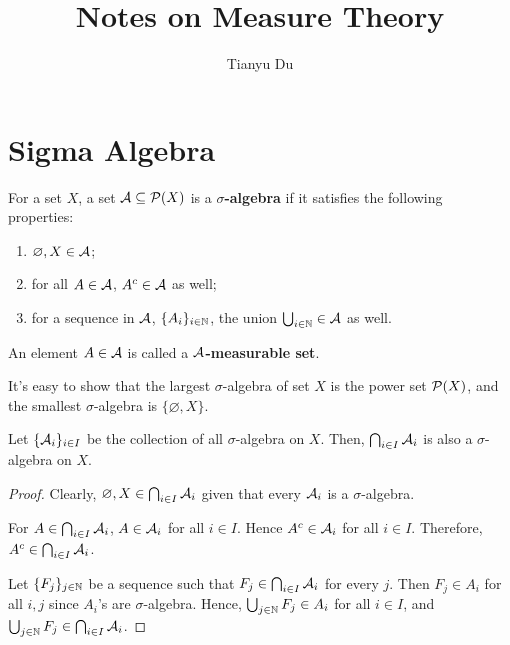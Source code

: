 \documentclass[11pt]{article}
\title{Notes on Measure Theory}
\author{Tianyu Du}
\newcommand{\s}[0]{$\sigma$}
\begin{document}
	
	\maketitle
	\tableofcontents
	\section{Sigma Algebra}
	\begin{definition}
		For a set $X$, a set $\mathcal{{A}} \subseteq \mathcal{{P}}(X)$ is a \textbf{\s-algebra} if it satisfies the following properties:
		\begin{enumerate}
			\item $\varnothing, X \in \mathcal{{A}}$;
			\item for all $A \in \mathcal{{A}}$, $A^c \in \mathcal{{A}}$ as well;
			\item for a sequence in $\mathcal{{A}}$, $\{A_i\}_{i\in\mathbb{N}}$, the union $\bigcup_{i\in\mathbb{N}} \in \mathcal{{A}}$ as well.
		\end{enumerate}
		An element $A \in \mathcal{{A}}$ is called a \textbf{$\mathcal{{A}}$-measurable set}.
	\end{definition}
	
	\begin{remark}
		It's easy to show that the largest \s-algebra of set $X$ is the power set $\mathcal{{P}}(X)$, and the smallest \s-algebra is $\{\varnothing, X\}$.
	\end{remark}
	
	\begin{theorem}
		Let $\{\mathcal{{A}}_i\}_{i \in I}$ be the collection of all $\sigma$-algebra on $X$. Then, $\bigcap_{i \in I} \mathcal{{A}}_i$ is also a $\sigma$-algebra on $X$.
	\end{theorem}
	
	\begin{proof}
		Clearly, $\varnothing, X \in \bigcap_{i \in I} \mathcal{{A}}_i$ given that every $\mathcal{{A}}_i$ is a \s-algebra.
		
		For $A \in \bigcap_{i \in I} \mathcal{{A}}_i$, $A \in \mathcal{{A}}_i$ for all $i \in I$. Hence $A^c \in \mathcal{{A}}_i$ for all $i \in I$. Therefore, $A^c \in \bigcap_{i \in I} \mathcal{{A}}_i$.
		
		Let $\{F_j\}_{j \in \mathbb{N}}$ be a sequence such that $F_j \in \bigcap_{i \in I} \mathcal{{A}}_i$ for every $j$. Then $F_j \in A_i$ for all $i, j$ since $A_i$'s are \s-algebra. Hence, $\bigcup_{j \in \mathbb{N}} F_j \in A_i$ for all $i \in I$, and $\bigcup_{j \in \mathbb{N}} F_j \in \bigcap_{i \in I} \mathcal{{A}}_i$.
	\end{proof}
	
\end{document}
